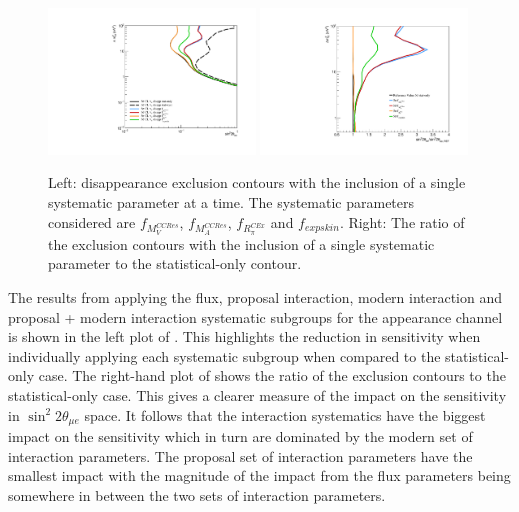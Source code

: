 \begin{figure}[h!]
    \centering
    \includegraphics[width = 0.49\textwidth]{figures-chap6/exclusion_contours/single_param/nue_disapp_single_param.pdf}
    \includegraphics[width =0.49\textwidth]{figures-chap6/exclusion_contours/single_param/nue_disapp_single_param_ratio.pdf}
    \caption[\nue disappearance exclusion contours with the inclusion of a single systematic parameter at a time.]{Left: \nue disappearance exclusion contours with the inclusion of a single systematic parameter at a time. The systematic parameters considered are $f_{M_V^{CCRes}}$, $f_{M_A^{CCRes}}$, $f_{R_{\pi}^{C Ex}}$ and $f_{expskin}$. Right: The ratio of the exclusion contours with the inclusion of a single systematic parameter to the statistical-only contour.}
    \label{fig::nue_disapp_single_param}
\end{figure}

\newpage

The results from applying the flux, proposal interaction, modern interaction and proposal + modern interaction systematic subgroups for the \nue appearance channel is shown in the left plot of  . This highlights the reduction in sensitivity when individually applying each systematic subgroup when compared to the statistical-only case. The right-hand plot of  shows the ratio of the exclusion contours to the statistical-only case. This gives a clearer measure of the impact on the sensitivity in $\sin^2{2\theta_{\mu e}}$ space. It follows that the interaction systematics have the biggest impact on the sensitivity which in turn are dominated by the modern set of interaction parameters. The proposal set of interaction parameters have the smallest impact with the magnitude of the impact from the flux parameters being somewhere in between the two sets of interaction parameters. 

